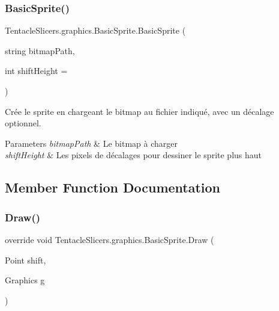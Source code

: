 \subsubsection{\texorpdfstring{Basic\+Sprite()}{BasicSprite()}\hspace{0.1cm}{\footnotesize\ttfamily [2/2]}}
{\footnotesize\ttfamily Tentacle\+Slicers.\+graphics.\+Basic\+Sprite.\+Basic\+Sprite (\begin{DoxyParamCaption}\item[{string}]{bitmap\+Path,  }\item[{int}]{shift\+Height = {} }\end{DoxyParamCaption})}



Crée le sprite en chargeant le bitmap au fichier indiqué, avec un décalage optionnel. 


\begin{DoxyParams}{Parameters}
{\em bitmap\+Path} & Le bitmap à charger \\
\hline
{\em shift\+Height} & Les pixels de décalages pour dessiner le sprite plus haut \\
\hline
\end{DoxyParams}


\subsection{Member Function Documentation}
\mbox{\label{class_tentacle_slicers_1_1graphics_1_1_basic_sprite_aca1918e67a22a98d4953d74f4e90a2f7}} 
\subsubsection{\texorpdfstring{Draw()}{Draw()}}
{\footnotesize\ttfamily override void Tentacle\+Slicers.\+graphics.\+Basic\+Sprite.\+Draw (\begin{DoxyParamCaption}\item[{Point}]{shift,  }\item[{Graphics}]{g }\end{DoxyParamCaption})\hspace{0.3cm}{\ttfamily [virtual]}}



